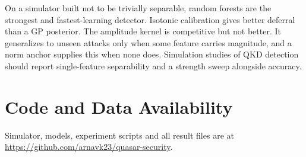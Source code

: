 \documentclass[conference,10pt]{IEEEtran}
\begin{document}
On a simulator built not to be trivially separable, random forests are the
strongest and fastest-learning detector. Isotonic calibration gives better
deferral than a GP posterior. The amplitude kernel is competitive but not better.
It generalizes to unseen attacks only when some feature carries magnitude, and a
norm anchor supplies this when none does. Simulation studies of QKD detection
should report single-feature separability and a strength sweep alongside
accuracy.

\section*{Code and Data Availability}
Simulator, models, experiment scripts and all result files are at
\url{https://github.com/arnavk23/quasar-security}.



\end{document}
